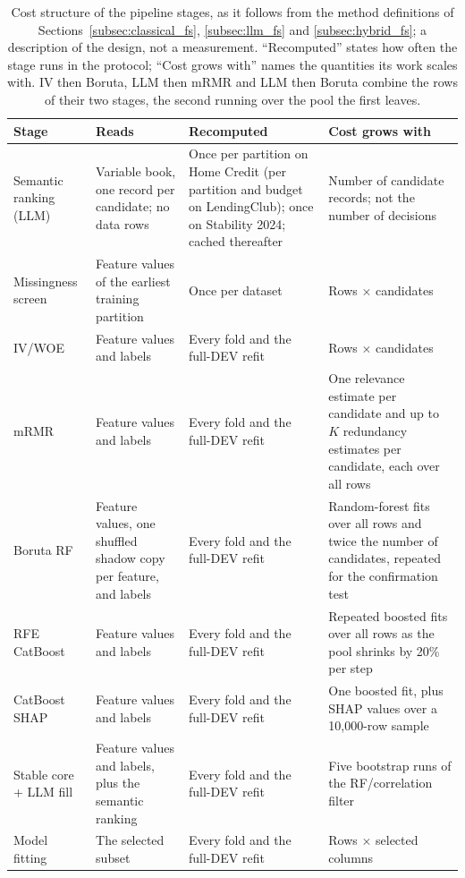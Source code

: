 \documentclass[final,5p,twocolumn]{elsarticle}
\newcommand{\Kfeat}{K}
\providecommand{\DIFaddtex}[1]{{\protect\color{blue} \sf #1}} %
\providecommand{\DIFaddFL}[1]{\DIFadd{#1}} %
\providecommand{\DIFaddbeginFL}{} %
\providecommand{\DIFaddendFL}{} %
\providecommand{\DIFdelendFL}{} %
\providecommand{\DIFadd}[1]{\texorpdfstring{\DIFaddtex{#1}}{#1}} %
\begin{document}
\begin{table}[htbp]
\DIFdelendFL \DIFaddbeginFL \begin{threeparttable}
\caption{\DIFaddFL{Cost structure of the pipeline stages, as it follows from the method definitions of Sections~\ref{subsec:classical_fs}, \ref{subsec:llm_fs} and \ref{subsec:hybrid_fs}; a description of the design, not a measurement. ``Recomputed'' states how often the stage runs in the protocol; ``Cost grows with'' names the quantities its work scales with. IV then Boruta, LLM then mRMR and LLM then Boruta combine the rows of their two stages, the second running over the pool the first leaves.}}
\label{tab:cost_structure}
\begin{tabular}{@{}L{27mm}L{42mm}L{40mm}L{\dimexpr\textwidth-109mm-6\tabcolsep\relax}@{}}
\toprule
Stage & Reads & Recomputed & Cost grows with \\
\midrule
Semantic ranking (LLM) & Variable book, one record per candidate; no data rows & Once per partition on Home Credit (per partition and budget on LendingClub); once on Stability 2024; cached thereafter & Number of candidate records; not the number of decisions \\
\addlinespace
Missingness screen & Feature values of the earliest training partition & Once per dataset & Rows $\times$ candidates \\
\addlinespace
IV/WOE & Feature values and labels & Every fold and the full-DEV refit & Rows $\times$ candidates \\
\addlinespace
mRMR & Feature values and labels & Every fold and the full-DEV refit & One relevance estimate per candidate and up to $\Kfeat$ redundancy estimates per candidate, each over all rows \\
\addlinespace
Boruta RF & Feature values, one shuffled shadow copy per feature, and labels & Every fold and the full-DEV refit & Random-forest fits over all rows and twice the number of candidates, repeated for the confirmation test \\
\addlinespace
RFE CatBoost & Feature values and labels & Every fold and the full-DEV refit & Repeated boosted fits over all rows as the pool shrinks by 20\% per step \\
\addlinespace
CatBoost SHAP & Feature values and labels & Every fold and the full-DEV refit & One boosted fit, plus SHAP values over a 10,000-row sample \\
\addlinespace
Stable core + LLM fill & Feature values and labels, plus the semantic ranking & Every fold and the full-DEV refit & Five bootstrap runs of the RF/correlation filter \\
\addlinespace
Model fitting & The selected subset & Every fold and the full-DEV refit & Rows $\times$ selected columns \\
\bottomrule
\end{tabular}
\DIFaddendFL \end{threeparttable}
\end{table}
\end{document}
